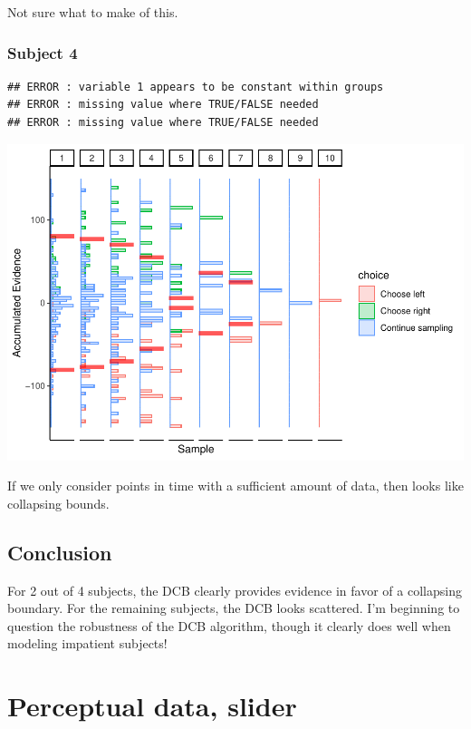 \documentclass[
]{book}
\begin{document}
Not sure what to make of this.

\hypertarget{subject-4}{%
\subsubsection*{Subject 4}\label{subject-4}}

\begin{verbatim}
## ERROR : variable 1 appears to be constant within groups 
## ERROR : missing value where TRUE/FALSE needed 
## ERROR : missing value where TRUE/FALSE needed
\end{verbatim}

\includegraphics{LateNightBayes_files/figure-latex/unnamed-chunk-21-1.pdf}

If we only consider points in time with a sufficient amount of data, then looks like collapsing bounds.

\hypertarget{conclusion-1}{%
\subsection*{Conclusion}\label{conclusion-1}}

For 2 out of 4 subjects, the DCB clearly provides evidence in favor of a collapsing boundary. For the remaining subjects, the DCB looks scattered. I'm beginning to question the robustness of the DCB algorithm, though it clearly does well when modeling impatient subjects!

\hypertarget{perceptual-data-slider}{%
\section{Perceptual data, slider}\label{perceptual-data-slider}}
\end{document}
